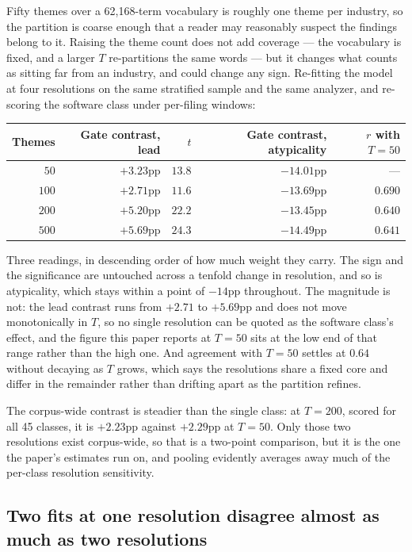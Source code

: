\documentclass[11pt]{article}
\begin{document}
Fifty themes over a 62,168-term vocabulary is roughly one theme per industry,
so the partition is coarse enough that a reader may reasonably suspect the
findings belong to it. Raising the theme count does not add coverage --- the
vocabulary is fixed, and a larger $T$ re-partitions the same words --- but it
changes what counts as sitting far from an industry, and could change any sign.
Re-fitting the model at four resolutions on the same stratified sample and the
same analyzer, and re-scoring the software class under per-filing windows:

\begin{center}\small
\begin{tabular}{rrrrr}
\toprule
Themes & Gate contrast, lead & $t$ & Gate contrast, atypicality & $r$ with $T=50$ \\
\midrule
$50$   & $+3.23$pp & $13.8$ & $-14.01$pp & --- \\
$100$  & $+2.71$pp & $11.6$ & $-13.69$pp & $0.690$ \\
$200$  & $+5.20$pp & $22.2$ & $-13.45$pp & $0.640$ \\
$500$  & $+5.69$pp & $24.3$ & $-14.49$pp & $0.641$ \\
\bottomrule
\end{tabular}
\end{center}

\noindent Three readings, in descending order of how much weight they carry.
The sign and the significance are untouched across a tenfold change in
resolution, and so is atypicality, which stays within a point of $-14$pp
throughout. The magnitude is not: the lead contrast runs from $+2.71$ to
$+5.69$pp and does not move monotonically in $T$, so no single resolution can
be quoted as the software class's effect, and the figure this paper reports at
$T = 50$ sits at the low end of that range rather than the high one. And
agreement with $T = 50$ settles at $0.64$ without decaying as $T$ grows, which
says the resolutions share a fixed core and differ in the remainder rather than
drifting apart as the partition refines.

The corpus-wide contrast is steadier than the single class: at $T = 200$,
scored for all 45 classes, it is $+2.23$pp against $+2.29$pp at $T = 50$. Only
those two resolutions exist corpus-wide, so that is a two-point comparison, but
it is the one the paper's estimates run on, and pooling evidently averages away
much of the per-class resolution sensitivity.

\subsection{Two fits at one resolution disagree almost as much as two resolutions}
\end{document}
